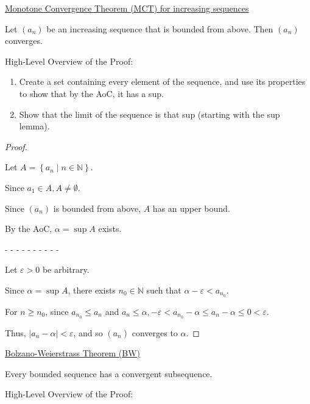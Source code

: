 \documentclass[12pt]{article}
\newcommand{\NN}{\mathbb{N}}
\newcommand\set[1]{\left\lbrace #1 \right\rbrace} %
\newcommand\abs[1]{\left| #1 \right|} %
\newcommand{\eps}{\varepsilon}
\begin{document}
\pagebreak

\underline{Monotone Convergence Theorem (MCT) for increasing sequences}

Let $(a_n)$ be an increasing sequence that is bounded from above. Then $(a_n)$ converges.

\dotfill

High-Level Overview of the Proof:

\begin{enumerate}
\item Create a set containing every element of the sequence, and use its properties to show that by the AoC, it has a sup.

\item Show that the limit of the sequence is that sup (starting with the sup lemma).
\end{enumerate}

\dotfill

\begin{proof}
$ $

Let $A = \set{a_n \mid n \in \NN}$.

Since $a_1 \in A, A \ne \emptyset$.

Since $(a_n)$ is bounded from above, $A$ has an upper bound.

By the AoC, $\alpha = \sup A$ exists.

- - - - - - - - - -

Let $\eps > 0$ be arbitrary.

Since $\alpha = \sup A$, there exists $n_0 \in \NN$ such that $\alpha - \eps < a_{n_0}$.

For $n \ge n_0$, since $a_{n_0} \le a_n$ and $a_n \le \alpha, -\eps < a_{n_0} - \alpha \le a_n - \alpha \le 0 < \eps$.

Thus, $\abs{a_n - \alpha} < \eps$, and so $(a_n)$ converges to $\alpha$.
\end{proof}

\pagebreak

\underline{Bolzano-Weierstrass Theorem (BW)}

Every bounded sequence has a convergent subsequence.

\dotfill

High-Level Overview of the Proof:
\end{document}
